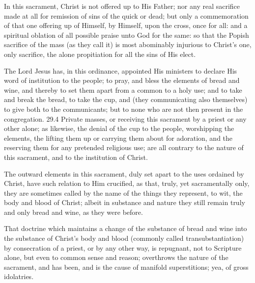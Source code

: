 \begin{outerlst}[left=0pt,labelsep=0pt]
\begin{innerlst}[resume*]
\item In this sacrament, Christ is not offered up to His Father; nor any real sacrifice made at all for remission of sins of the quick or dead; but only a commemoration of that one offering up of Himself, by Himself, upon the cross, once for all: and a spiritual oblation of all possible praise unto God for the same: so that the Popish sacrifice of the mass (as they call it) is most abominably injurious to Christ's one, only sacrifice, the alone propitiation for all the sins of His elect.   

\item The Lord Jesus has, in this ordinance, appointed His ministers to declare His word of institution to the people; to pray, and bless the elements of bread and wine, and thereby to set them apart from a common to a holy use; and to take and break the bread, to take the cup, and (they communicating also themselves) to give both to the communicants; but to none who are not then present in the congregation.  29.4 Private masses, or receiving this sacrament by a priest or any other alone; as likewise, the denial of the cup to the people, worshipping the elements, the lifting them up or carrying them about for adoration, and the reserving them for any pretended religious use; are all contrary to the nature of this sacrament, and to the institution of Christ.   

\item The outward elements in this sacrament, duly set apart to the uses ordained by Christ, have such relation to Him crucified, as that, truly, yet sacramentally only, they are sometimes called by the name of the things they represent, to wit, the body and blood of Christ; albeit in substance and nature they still remain truly and only bread and wine, as they were before.   

\item That doctrine which maintains a change of the substance of bread and wine into the substance of Christ's body and blood (commonly called transubstantiation) by consecration of a priest, or by any other way, is repugnant, not to Scripture alone, but even to common sense and reason; overthrows the nature of the sacrament, and has been, and is the cause of manifold superstitions; yea, of gross idolatries.   


\end{innerlst}
\end{outerlst}
